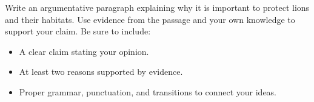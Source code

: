 \documentclass[12pt]{article}
\begin{document}
\begin{tcolorbox}[colframe=black!50, colback=white, title=Question 10: Writing Performance Task]
Write an argumentative paragraph explaining why it is important to protect lions and their habitats. Use evidence from the passage and your own knowledge to support your claim. Be sure to include:  
\begin{itemize}
    \item A clear claim stating your opinion.  
    \item At least two reasons supported by evidence.  
    \item Proper grammar, punctuation, and transitions to connect your ideas.  
\end{itemize}

\vspace{2em}
\\[0.8cm] \underline{\hspace{15.8cm}}  
    \\[0.8cm] \underline{\hspace{15.8cm}}  
    \\[0.8cm] \underline{\hspace{15.8cm}}  
    \\[0.8cm] \underline{\hspace{15.8cm}}  
    \\[0.8cm] \underline{\hspace{15.8cm}}  
    \\[0.8cm] \underline{\hspace{15.8cm}}  
       \\[0.8cm] \underline{\hspace{15.8cm}}  
  
\end{tcolorbox}
\newpage
\end{document}

